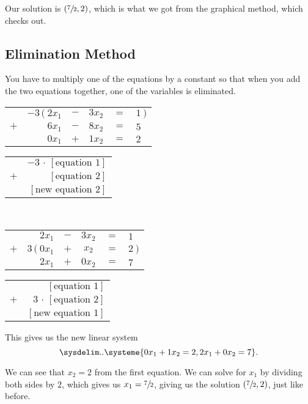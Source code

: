 Our solution is $(\sfrac{7}{2}, 2)$, which is what we got from the graphical
method, which checks out.


\subsection{Elimination Method}
\label{sub_sec:elimination_method}

You have to multiply one of the equations by a constant so that when you add the
two equations together, one of the variables is eliminated.

\begin{center}
  \begin{tabular}{crcccl}
      & $-3\,(~2x_1$ & $-$ & $3x_2$ & $=$ & $1~)$ \\
    $+$ & $6x_1$ & $-$ & $8x_2$ & $=$ & $5$ \\
    \hline
        & $0x_1$ & $+$ & $1x_2$ & $=$ & $2$
  \end{tabular}\quad\quad
  \begin{tabular}{cr}
      & $-3\,\cdot\,[\text{equation 1}]$ \\
    $+$ & $[\text{equation 2}]$ \\
    \hline
        & $[\text{new equation 2}]$
  \end{tabular} \\\vspace{3ex}
  \begin{tabular}{crcccl}
      & $2x_1$ & $-$ & $3x_2$ & $=$ & $1$ \\
    $+$ & $3\,(~0x_1$ & $+$ & $x_2$ & $=$ & $2~)$ \\
    \hline
        & $2x_1$ & $+$ & $0x_2$ & $=$ & $7$
  \end{tabular}\quad\quad
  \begin{tabular}{cr}
      & $[\text{equation 1}]$ \\
    $+$ & $3\,\cdot\,[\text{equation 2}]$ \\
    \hline
        & $[\text{new equation 1}]$
  \end{tabular}
\end{center}

This gives us the new linear system
\[%
  \sysdelim..\systeme{
    0x_1 + 1x_2 = 2,
    2x_1 + 0x_2 = 7
  }
.\]%

We can see that $x_2 = 2$ from the first equation. We can solve for $x_1$ by
dividing both sides by $2$, which gives us $x_1 = \sfrac{7}{2}$, giving us the
solution $(\sfrac{7}{2}, 2)$, just like before.

